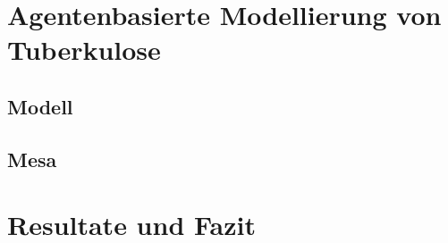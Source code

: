 \documentclass[paper=a4, fontsize=11pt, ngerman, abstract=on]{scrartcl}
\numberwithin{equation}{section} %
\numberwithin{figure}{section} %
\numberwithin{table}{section} %
\begin{document}
\blindtext

\section{Agentenbasierte Modellierung von Tuberkulose}

\blindtext

\subsection{Modell}

\blindtext

\subsection{Mesa}

\blindtext

\section{Resultate und Fazit}

\blindtext

\newpage



\end{document}
